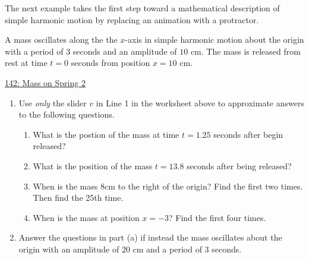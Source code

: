 \documentclass{ximera}
\begin{document}
The next example takes the first step toward a mathematical description of simple harmonic motion by replacing an animation with a protractor.

\begin{example}  \label{Ex:PDoEr3rdfsx}
A mass oscillates along the the $x$-axis in simple harmonic motion  about the origin  with a period of $3$ seconds and an amplitude of $10$ cm. The mass is released from rest at time $t=0$ seconds from position $x=10$ cm.

\begin{onlineOnly}
    \begin{center}
\end{center}
\end{onlineOnly}

\href{https://www.desmos.com/calculator/rqdenajviu}{142: Mass on Spring 2 }

\begin{enumerate}

\item Use \emph{only} the slider $v$ in Line 1 in the worksheet above to approximate answers to the following questions.

\begin{enumerate}
\item What is the postion of the mass at time $t=1.25$ seconds after begin released?

\item What is the position of the mass $t=13.8$ seconds after being released?

\item When is the mass $8$cm to the right of the origin? Find the first two times. Then find the 25th time.

\item When is the mass  at position $x = -3$? Find the first four times.  
\end{enumerate}

\item Answer the questions in part (a) if instead the mass oscillates about the origin with an amplitude of $20$ cm and a period of $3$ seconds.



\end{enumerate}
\end{example}
\end{document}
